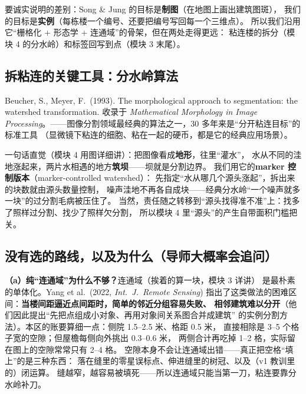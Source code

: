 要诚实说明的差别：Song \& Jung 的目标是\textbf{制图}（在地图上画出建筑图斑），
我们的目标是\textbf{实例}（每栋楼一个编号、还要把编号写回每一个三维点）。
所以我们沿用它``栅格化 + 形态学 + 连通域''的骨架，但在两处走得更远：
粘连楼的拆分（模块 4 的分水岭）和标签回写到点（模块 3 末尾）。

\subsection{拆粘连的关键工具：分水岭算法}

\begin{paperbox}[：经典算法文献]
Beucher, S., Meyer, F.\ (1993). The morphological approach to segmentation:
the watershed transformation. 收录于 \textit{Mathematical Morphology in Image
Processing}。——图像分割领域最经典的算法之一，30 多年来是``分开粘连目标''的标准工具
（显微镜下粘连的细胞、粘在一起的硬币，都是它的经典应用场景）。
\end{paperbox}

一句话直觉（模块 4 用图详细讲）：把图像看成\textbf{地形}，往里``灌水''，
水从不同的洼地涨起来，两片水相遇的地方\textbf{筑坝}——坝就是分割边界。
我们用它的\textbf{marker 控制版本}（marker-controlled watershed）：
先指定``水从哪几个源头涨起''，拆出来的块数就由源头数量控制，
噪声洼地不再各自成块——经典分水岭``一个噪声就多一块''的过分割毛病被压住了。
当然，责任随之转移到``源头找得准不准''上：找多了照样过分割、找少了照样欠分割，
所以模块 4 里``源头''的产生自带面积门槛把关。

\subsection{没有选的路线，以及为什么（导师大概率会追问）}

\textbf{（a）纯``连通域''为什么不够？}连通域（挨着的算一块，模块 3 详讲）
是最朴素的单体化。Yang et al.\ (2022, \textit{Int.\ J.\ Remote Sensing})
指出了这类做法的困难区间：\textbf{当楼间距逼近点间距时，简单的邻近分组容易失败、
相邻建筑难以分开}（他们因此提出``先把点组成小对象、再用对象间关系图合并成建筑''
的实例分割方法）。本区的账要算细一点：侧院 1.5--2.5 米、格距 0.5 米，
直接相除是 3--5 个格子宽的空隙；但屋檐每侧向外挑出 0.3--0.6 米，
两侧合计再吃掉 1--2 格，实际留在图上的空隙常常只有 2--4 格。
空隙本身不会让连通域出错——真正把空格``填上''的是三种东西：
落在缝里的零星误标点、伸进缝里的树冠、以及（v1 教训里的）闭运算。
缝越窄，越容易被填死——所以连通域只能当第一刀，粘连要靠分水岭补刀。

